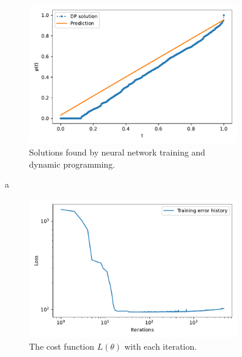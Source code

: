 

\begin{figure}[t]\label{fig:curve_1_so3_example}
    \begin{subfigure}[t]{0.5\textwidth}
        \centering
        \includegraphics[width=\linewidth]{figures/curve_so3/pc_eks_2/plot_1_0.pdf}
        \caption{Solutions found by neural network training and dynamic programming.}
        \label{fig:curve_so3_pc_solution}
    \end{subfigure}a
    \begin{subfigure}[t]{0.5\textwidth}
        \centering
        \includegraphics[width=\linewidth]{figures/curve_so3/pc_eks_2/history_plot_1.pdf}
        \caption{The cost function \(L(\theta)\) with each iteration.}
        \label{fig:curve_so3_pc_history}
    \end{subfigure}
    \begin{subfigure}[t]{0.5\textwidth}

\end{subfigure}
\end{figure}
